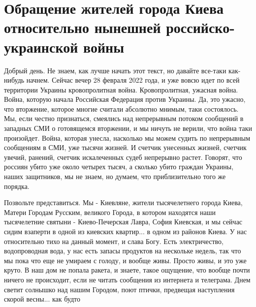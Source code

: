  
 
 
 
 

\section{Обращение жителей города Киева относительно нынешней российско-украинской войны}

Добрый день. Не знаем, как лучше начать этот текст, но давайте все-таки
как-нибудь начнем. Сейчас вечер 28 февраля 2022 года, и уже вовсю идет по всей
территории Украины кровопролитная война. Кровопролитная, ужасная война.  Война,
которую начала Российская Федерация против Украины. Да, это ужасно, что
вторжение, которое многие считали абсолютно мнимым, таки состоялось. Мы, если
честно признаться, смеялись над непрерывным потоком сообщений в западных СМИ о
готовящемся вторжении, и мы ничуть не верили, что война таки произойдет. Война,
которая унесла, насколько мы можем судить по непрерывным сообщениям в СМИ, уже
тысячи жизней. И счетчик унесенных жизней, счетчик увечий, ранений, счетчик
искалеченных судеб непрерывно растет. Говорят, что россиян убито уже около
четырех тысяч, а сколько убито граждан Украины, наших защитников, мы не знаем,
но думаем, что приблизительно того же порядка.

Позвольте представиться. Мы - Киевляне, жители тысячелетнего города Киева,
Матери Городам Русским, великого Города, в котором находятся наши тысячелетние
святыни - Киево-Печерская Лавра, София Киевская, и мы сейчас сидим взаперти в
одной из киевских квартир... в одном из районов Киева. У нас относительно тихо
на данный момент, и слава Богу. Есть электричество, водопроводная вода, у нас
есть запасы продуктов на нескольке недель, так что мы пока что еще не умираем с
голоду, и вообще живы. Просто живы, и это уже круто. В наш дом не попала
ракета, и знаете, такое ощущение, что вообще почти ничего не происходит, если
не читать сообщения из интернета и телеграма. Днем светит солнышко над нашим Городом, поют птички,
предвещая наступления скорой весны... как будто

